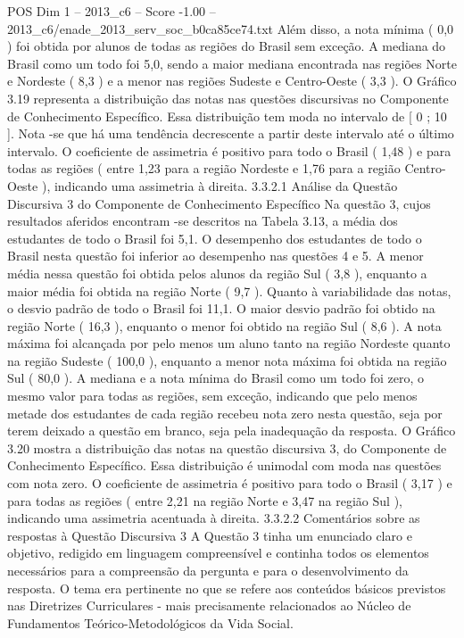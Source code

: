\begin{textsample}{POS Dim 1 – 2013\_c6 – Score -1.00 – 2013\_c6/enade\_2013\_serv\_soc\_b0ca85ce74.txt}
Além disso, a nota mínima ( 0,0 ) foi obtida por alunos de todas as regiões do Brasil sem exceção.
A mediana do Brasil como um todo foi 5,0, sendo a maior mediana encontrada nas regiões Norte e Nordeste ( 8,3 ) e a menor nas regiões Sudeste e Centro-Oeste ( 3,3 ).
O Gráfico 3.19 representa a distribuição das notas nas questões discursivas no Componente de Conhecimento Específico.
Essa distribuição tem moda no intervalo de [ 0 ; 10 ].
Nota -se que há uma tendência decrescente a partir deste intervalo até o último intervalo.
O coeficiente de assimetria é positivo para todo o Brasil ( 1,48 ) e para todas as regiões ( entre 1,23 para a região Nordeste e 1,76 para a região Centro-Oeste ), indicando uma assimetria à direita. 3.3.2.1 Análise da Questão Discursiva 3 do Componente de Conhecimento Específico Na questão 3, cujos resultados aferidos encontram -se descritos na Tabela 3.13, a média dos estudantes de todo o Brasil foi 5,1.
O desempenho dos estudantes de todo o Brasil nesta questão foi inferior ao desempenho nas questões 4 e 5.
A menor média nessa questão foi obtida pelos alunos da região Sul ( 3,8 ), enquanto a maior média foi obtida na região Norte ( 9,7 ).
Quanto à variabilidade das notas, o desvio padrão de todo o Brasil foi 11,1.
O maior desvio padrão foi obtido na região Norte ( 16,3 ), enquanto o menor foi obtido na região Sul ( 8,6 ).
A nota máxima foi alcançada por pelo menos um aluno tanto na região Nordeste quanto na região Sudeste ( 100,0 ), enquanto a menor nota máxima foi obtida na região Sul ( 80,0 ).
A mediana e a nota mínima do Brasil como um todo foi zero, o mesmo valor para todas as regiões, sem exceção, indicando que pelo menos metade dos estudantes de cada região recebeu nota zero nesta questão, seja por terem deixado a questão em branco, seja pela inadequação da resposta.
O Gráfico 3.20 mostra a distribuição das notas na questão discursiva 3, do Componente de Conhecimento Específico.
Essa distribuição é unimodal com moda nas questões com nota zero.
O coeficiente de assimetria é positivo para todo o Brasil ( 3,17 ) e para todas as regiões ( entre 2,21 na região Norte e 3,47 na região Sul ), indicando uma assimetria acentuada à direita. 3.3.2.2 Comentários sobre as respostas à Questão Discursiva 3 A Questão 3 tinha um enunciado claro e objetivo, redigido em linguagem compreensível e continha todos os elementos necessários para a compreensão da pergunta e para o desenvolvimento da resposta.
O tema era pertinente no que se refere aos conteúdos básicos previstos nas Diretrizes Curriculares - mais precisamente relacionados ao Núcleo de Fundamentos Teórico-Metodológicos da Vida Social.

\end{textsample}
